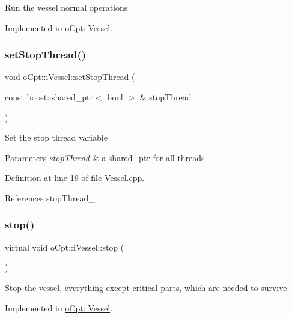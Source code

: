 Run the vessel normal operations 

Implemented in \hyperlink{classo_cpt_1_1_vessel_a6cd07e32cc601b1f3a45881b42ea36ef}{o\+Cpt\+::\+Vessel}.

\hypertarget{classo_cpt_1_1i_vessel_aacfbb96114c16a264b133e2d75c5a083}{}\label{classo_cpt_1_1i_vessel_aacfbb96114c16a264b133e2d75c5a083} 
\subsubsection{\texorpdfstring{set\+Stop\+Thread()}{setStopThread()}}
{\footnotesize\ttfamily void o\+Cpt\+::i\+Vessel\+::set\+Stop\+Thread (\begin{DoxyParamCaption}\item[{const boost\+::shared\+\_\+ptr$<$ bool $>$ \&}]{stop\+Thread }\end{DoxyParamCaption})}

Set the stop thread variable 
\begin{DoxyParams}{Parameters}
{\em stop\+Thread} & a shared\+\_\+ptr for all threads \\
\hline
\end{DoxyParams}


Definition at line 19 of file Vessel.\+cpp.



References stop\+Thread\+\_\+.

\hypertarget{classo_cpt_1_1i_vessel_a1cfbb23ae3e73a3587688bf7fbc3f0af}{}\label{classo_cpt_1_1i_vessel_a1cfbb23ae3e73a3587688bf7fbc3f0af} 
\subsubsection{\texorpdfstring{stop()}{stop()}}
{\footnotesize\ttfamily virtual void o\+Cpt\+::i\+Vessel\+::stop (\begin{DoxyParamCaption}{ }\end{DoxyParamCaption})\hspace{0.3cm}{\ttfamily [pure virtual]}}

Stop the vessel, everything except critical parts, which are needed to survive 

Implemented in \hyperlink{classo_cpt_1_1_vessel_a87e321618ea1d1ca21fffbe64bbffbc0}{o\+Cpt\+::\+Vessel}.



